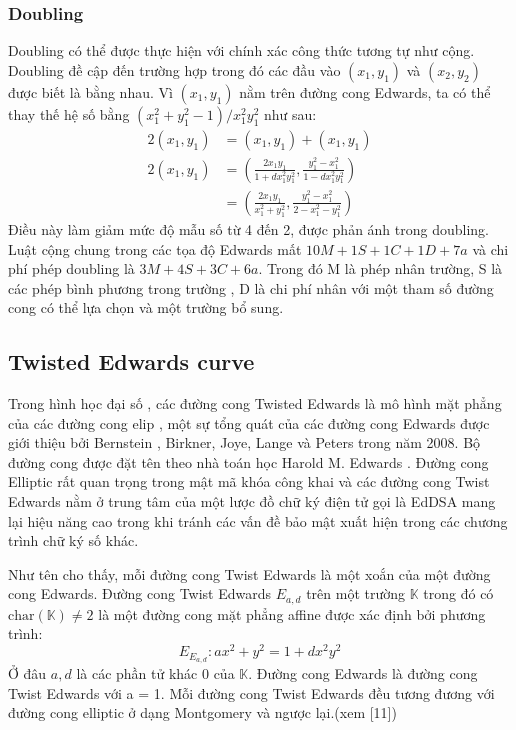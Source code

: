 \documentclass[a4paper,12pt]{report}
\begin{document}
\subsubsection{Doubling}
Doubling có thể được thực hiện với chính xác công thức tương tự như cộng. Doubling đề cập đến trường hợp trong đó các đầu vào $(x_1, y_1)$ và $(x_2, y_2)$ được biết là bằng nhau. Vì $(x_1, y_1)$ nằm trên đường cong Edwards, ta có thể thay thế hệ số bằng $(x_1^2 + y_1^2  - 1)/x_1^2y_1^2$ như sau:
\begin{displaymath}
{\begin{aligned}2(x_{1},y_{1})&=(x_{1},y_{1})+(x_{1},y_{1})\\[6pt]2(x_{1},y_{1})&=\left({\frac  {2x_{1}y_{1}}{1+dx_{1}^{2}y_{1}^{2}}},{\frac  {y_{1}^{2}-x_{1}^{2}}{1-dx_{1}^{2}y_{1}^{2}}}\right)\\[6pt]&=\left({\frac  {2x_{1}y_{1}}{x_{1}^{2}+y_{1}^{2}}},{\frac  {y_{1}^{2}-x_{1}^{2}}{2-x_{1}^{2}-y_{1}^{2}}}\right)\end{aligned}}
\end{displaymath}
Điều này làm giảm mức độ mẫu số từ 4 đến 2, được phản ánh trong doubling. Luật cộng chung trong các tọa độ Edwards mất $10M + 1S + 1C + 1D + 7a$ và chi phí phép doubling là $3M + 4S + 3C + 6a$. Trong đó M là phép nhân trường, S là các phép bình phương trong trường , D là chi phí nhân với một tham số đường cong có thể lựa chọn và một trường bổ sung.
\subsection*{Twisted Edwards curve}
Trong hình học đại số , các đường cong Twisted Edwards là mô hình mặt phẳng của các đường cong elip , một sự tổng quát của các đường cong Edwards được giới thiệu bởi Bernstein , Birkner, Joye, Lange và Peters trong năm 2008. Bộ đường cong được đặt tên theo nhà toán học Harold M. Edwards . Đường cong Elliptic rất quan trọng trong mật mã khóa công khai và các đường cong Twist Edwards nằm ở trung tâm của một lược đồ chữ ký điện tử  gọi là EdDSA mang lại hiệu năng cao trong khi tránh các vấn đề bảo mật xuất hiện trong các chương trình chữ ký số khác.

Như tên cho thấy, mỗi đường cong Twist Edwards là một xoắn của một đường cong Edwards. Đường cong Twist Edwards $E_{a, d}$ trên một trường $\displaystyle \mathbb{K}$ trong đó có $\displaystyle \mathrm{char}(\mathbb{K}) \neq 2$ là một đường cong mặt phẳng affine được xác định bởi phương trình:
\begin{displaymath}
E_{E_{a,d}}: ax^2 + y^2 = 1 + dx^2y^2
\end{displaymath}
Ở đâu $a, d$ là các phần tử khác 0 của $\displaystyle \mathbb{K}$. Đường cong Edwards là đường cong Twist Edwards với a = 1.
Mỗi đường cong Twist Edwards đều tương đương với đường cong elliptic ở dạng Montgomery và ngược lại.(xem [11])
\end{document}

